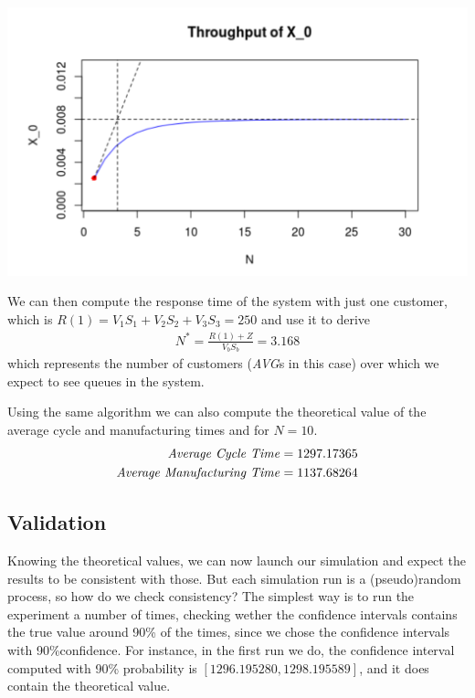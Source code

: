 \documentclass[paper=a4, fontsize=11pt]{scrartcl}
\numberwithin{equation}{section}		%
\numberwithin{figure}{section}			%
\numberwithin{table}{section}				%
\begin{document}
\includegraphics[width=\textwidth]{"img/X0"}

We can then compute the response time of the system with just one customer, which is $R(1) = V_1 S_1 + V_2 S_2 + V_3 S_3 = 250$ and use it to derive
\begin{align}
N^* = \frac{R(1) + Z}{V_b S_b} = 3.168
\end{align}
which represents the number of customers (\textit{AVG}s in this case) over which we expect to see queues in the system.

Using the same algorithm we can also compute the theoretical value of the average cycle and manufacturing times and  for $N = 10$.
\begin{align}
\text{\textit{Average Cycle Time}} &= 1297.17365 \\
\text{\textit{Average Manufacturing Time}} &= 1137.68264
\end{align}

\subsection{Validation}
Knowing the theoretical values, we can now launch our simulation and expect the results to be consistent with those. But each simulation run is a (pseudo)random process, so how do we check consistency? The simplest way is to run the experiment a number of times, checking wether the confidence intervals contains the true value around 90\% of the times, since we chose the confidence intervals with 90\%confidence. For instance, in the first run we do, the confidence interval computed with 90\% probability is $\left[1296.195280, 1298.195589\right]$, and it does contain the theoretical value.
\end{document}
